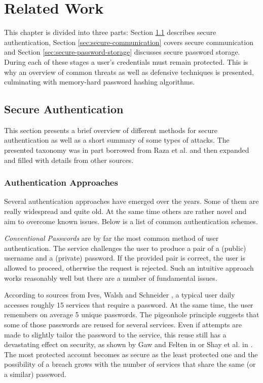 \chapter{Related Work}
\label{chapter:related-work}

This chapter is divided into three parts: Section \ref{sec:secure-authentication} describes secure authentication, Section \ref{sec:secure-communication} covers secure communication and Section \ref{sec:secure-password-storage} discusses secure password storage. During each of these stages a user's credentials must remain protected. This is why an overview of common threats as well as defensive techniques is presented, culminating with memory-hard password hashing algorithms.

\section{Secure Authentication}
\label{sec:secure-authentication}

This section presents a brief overview of different methods for secure authentication as well as a short summary of some types of attacks. The presented taxonomy was in part borrowed from Raza et al. \cite{raza:2012:password-attacks-survey} and then expanded and filled with details from other sources.

\subsection{Authentication Approaches}
\label{subsec:authentication-approaches}

Several authentication approaches have emerged over the years. Some of them are really widespread and quite old.  At the same time others are rather novel and aim to overcome known issues. Below is a list of common authentication schemes.

\emph{Conventional Passwords} are by far the most common method of user authentication. The service challenges the user to produce a pair of a (public) username and a (private) password. If the provided pair is correct, the user is allowed to proceed, otherwise the request is rejected. Such an intuitive approach works reasonably well but there are a number of fundamental issues.

 According to sources from Ives, Walsh and Schneider \cite{ives:2004:domino}, a typical user daily accesses roughly 15 services that require a password. At the same time, the user remembers on average 5 unique passwords. The pigeonhole principle suggests that some of those passwords are reused for several services. Even if attempts are made to slightly tailor the password to the service, this reuse still has a devastating effect on security, as shown by Gaw and Felten in \cite{gaw2006password} or Shay et al. in \cite{shay2010encountering}. The most protected account becomes as secure as the least protected one and the possibility of a breach grows with the number of services that share the same (or a similar) password.

